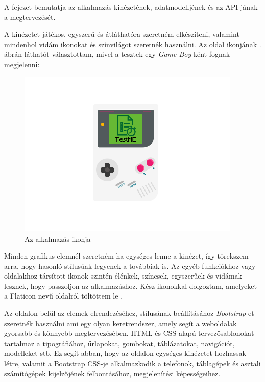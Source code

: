 

A fejezet bemutatja az alkalmazás kinézetének, adatmodelljének és az API-jának a megtervezését.


A kinézetet játékos, egyszerű és átláthatóra szeretném elkészíteni, valamint mindenhol vidám ikonokat és színvilágot szeretnék használni. Az oldal ikonjának . ábrán láthatót választottam, mivel a tesztek egy \textit{Game Boy}-ként fognak megjelenni:

\begin{figure}[h]
    \centering
    \includegraphics[height=8cm]{images/gameboy.png}
    \caption{Az alkalmazás ikonja}
    \label{fig:icon}
\end{figure}

Minden grafikus elemnél szeretném ha egységes lenne a kinézet, így törekszem arra, hogy hasonló stílusúak legyenek a továbbiak is. Az egyéb funkciókhoz vagy oldalakhoz társított ikonok szintén élénkek, színesek, egyszerűek és vidámak lesznek, hogy passzoljon az alkalmazáshoz. Kész ikonokkal dolgoztam, amelyeket a Flaticon nevű oldalról töltöttem le \cite{flaticon}. \newline

Az oldalon belül az elemek elrendezéséhez, stílusának beállításához \textit{Bootstrap}-et szeretnék használni ami egy olyan keretrendszer, amely segít a weboldalak gyorsabb és könnyebb megtervezésében. HTML és CSS alapú tervezősablonokat tartalmaz a tipográfiához, űrlapokat, gombokat, táblázatokat, navigációt, modelleket stb. Ez segít abban, hogy az oldalon egységes kinézetet hozhassak létre, valamit a Bootstrap CSS-je alkalmazkodik a telefonok, táblagépek és asztali számítógépek kijelzőjének felbontásához, megjelenítési képességeihez.

